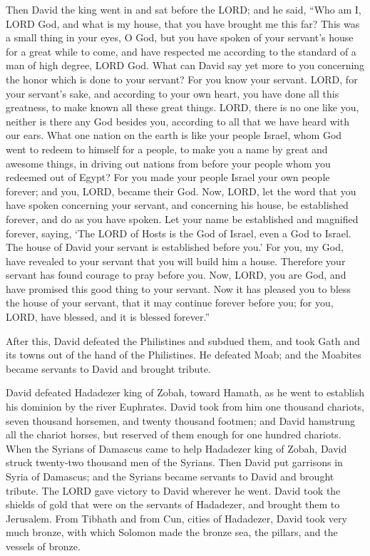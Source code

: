 \myverse{}Then David the king went in and sat before the LORD; and he
said, “Who am I, LORD God, and what is my house, that you have brought me this far?
\myverse{}This was a small thing in your eyes, O God, but you have spoken of your servant’s
house for a great while to come, and have respected me according to the standard of a man of high degree,
LORD God.
\myverse{}What can David say yet more to you concerning the honor which is done to
your servant? For you know your servant.
\myverse{}LORD, for your servant’s sake, and according to your own heart, you have
done all this greatness, to make known all these great things.
\myverse{}LORD, there is no one like you, neither is there any God besides you, according
to all that we have heard with our ears.
\myverse{}What one nation on the earth is like your people Israel, whom God went to
redeem to himself for a people, to make you a name by great and awesome things, in driving out nations
from before your people whom you redeemed out of Egypt?
\myverse{}For you made your people Israel your own people forever; and you, LORD, became
their God.
\myverse{}Now, LORD, let the word that you have spoken concerning your servant, and
concerning his house, be established forever, and do as you have spoken.
\myverse{}Let your name be established and magnified forever, saying, ‘The LORD of
Hosts is the God of Israel, even a God to Israel. The house of David your servant is established before
you.’
\myverse{}For you, my God, have revealed to your servant that you will build him a
house. Therefore your servant has found courage to pray before you.
\myverse{}Now, LORD, you are God, and have promised this good thing to your servant.
\myverse{}Now it has pleased you to bless the house of your servant, that it may continue
forever before you; for you, LORD, have blessed, and it is blessed forever.”



 \myverse*{}After this, David defeated the Philistines and subdued them, and
took Gath and its towns out of the hand of the Philistines.
\myverse{}He defeated Moab; and the Moabites became servants to David and brought tribute.

\myverse{}David defeated Hadadezer king of Zobah, toward Hamath, as he went
to establish his dominion by the river Euphrates.
\myverse{}David took from him one thousand chariots, seven thousand horsemen, and twenty
thousand footmen; and David hamstrung all the chariot horses, but reserved of them enough for one hundred
chariots.
\myverse{}When the Syrians of Damascus came to help Hadadezer king of Zobah, David struck
twenty-two thousand men of the Syrians.
\myverse{}Then David put garrisons in Syria of Damascus; and the Syrians became servants
to David and brought tribute. The LORD gave victory to David wherever he went.
\myverse{}David took the shields of gold that were on the servants of Hadadezer, and
brought them to Jerusalem.
\myverse{}From Tibhath and from Cun, cities of Hadadezer, David took very much bronze,
with which Solomon made the bronze sea, the pillars, and the vessels of bronze.

